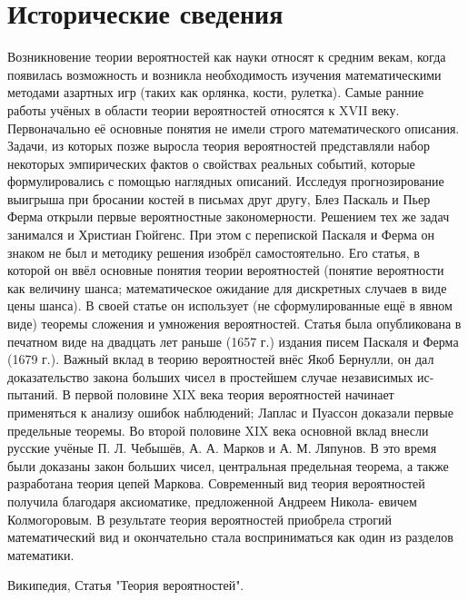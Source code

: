 \part*{Исторические сведения}
Возникновение теории вероятностей как науки относят к средним векам,
когда появилась возможность и возникла необходимость изучения математическими методами азартных игр (таких как орлянка, кости, рулетка). Самые
ранние работы учёных в области теории вероятностей относятся к XVII веку. Первоначально её основные понятия не имели строго математического
описания. Задачи, из которых позже выросла теория вероятностей представляли набор некоторых эмпирических фактов о свойствах реальных событий,
которые формулировались с помощью наглядных описаний. Исследуя прогнозирование выигрыша при бросании костей в письмах друг другу, Блез
Паскаль и Пьер Ферма открыли первые вероятностные закономерности. Решением тех же задач занимался и Христиан Гюйгенс. При этом с перепиской
Паскаля и Ферма он знаком не был и методику решения изобрёл самостоятельно. Его статья, в которой он ввёл основные понятия теории вероятностей (понятие вероятности как величину шанса; математическое ожидание
для дискретных случаев в виде цены шанса). В своей статье он использует
(не сформулированные ещё в явном виде) теоремы сложения и умножения
вероятностей. Статья была опубликована в печатном виде на двадцать лет
раньше (1657 г.) издания писем Паскаля и Ферма (1679 г.).
Важный вклад в теорию вероятностей внёс Якоб Бернулли, он дал доказательство закона больших чисел в простейшем случае независимых ис-
пытаний. В первой половине XIX века теория вероятностей начинает применяться к анализу ошибок наблюдений; Лаплас и Пуассон доказали первые
предельные теоремы. Во второй половине XIX века основной вклад внесли
русские учёные П. Л. Чебышёв, А. А. Марков и А. М. Ляпунов. В это время были доказаны закон больших чисел, центральная предельная теорема,
а также разработана теория цепей Маркова. Современный вид теория вероятностей получила благодаря аксиоматике, предложенной Андреем Никола-
евичем Колмогоровым. В результате теория вероятностей приобрела строгий
математический вид и окончательно стала восприниматься как один из разделов математики.

Википедия,
Статья "Теория вероятностей".